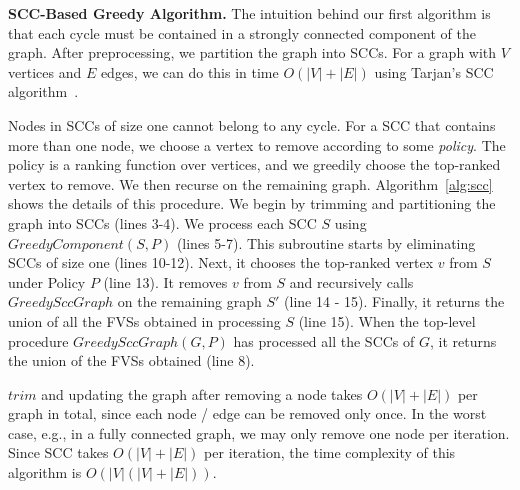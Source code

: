 \begin{algorithm}[t]
	\SetAlgoLined\DontPrintSemicolon
	\caption{Sort-based greedy algorithm}
	\label{alg:sort}
\end{algorithm}

{\bf SCC-Based Greedy Algorithm.} The intuition behind our first algorithm is that each cycle must be contained in a strongly connected component of the graph. After preprocessing, we partition the graph into SCCs. For a graph with $V$ vertices and $E$ edges, we can do this in time $O(|V|+|E|)$ using Tarjan's SCC algorithm~\cite{tarjan1972depth}.

Nodes in SCCs of size one cannot belong to any cycle. For a SCC that contains
more than one node, we choose a vertex to remove according to some \emph{policy}. The policy is a ranking function over vertices, and we greedily choose the top-ranked vertex to remove. We then recurse on the remaining graph. Algorithm~\ref{alg:scc} shows the details of this procedure. We begin by trimming and partitioning the graph into SCCs  (lines 3-4). We process each SCC $S$ using $GreedyComponent(S, P)$ (lines 5-7). This subroutine starts by eliminating SCCs of size one (lines 10-12). Next, it chooses the top-ranked vertex $v$ from $S$ under Policy $P$ (line 13). It removes $v$ from $S$ and recursively calls $GreedySccGraph$ on the remaining graph $S'$ (line 14 - 15). Finally, it returns the union of all the FVSs obtained in processing $S$ (line 15). When the top-level procedure $GreedySccGraph(G, P)$ has processed all the SCCs of $G$, it returns the union of the FVSs obtained (line 8).

$trim$ and updating the graph after removing a node takes $O(|V| + |E|)$ per
graph in total, since each node / edge can be removed only once. In the worst case, e.g., in a fully connected graph, we may only remove one node per iteration. Since SCC takes $O(|V|+|E|)$ per iteration, the time complexity of this algorithm is $O(|V|(|V|+|E|))$.

